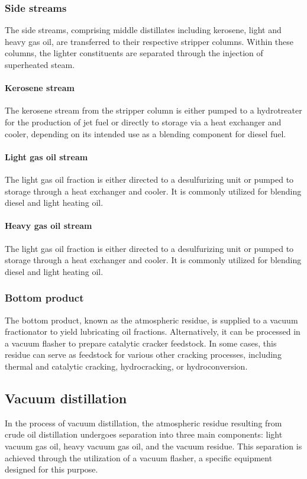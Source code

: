 \subsubsection{Side streams}
The side streams, comprising middle distillates including kerosene, light and heavy gas oil, are transferred to their respective stripper columns. 
Within these columns, the lighter constituents are separated through the injection of superheated steam.

\paragraph{Kerosene stream}
The kerosene stream from the stripper column is either pumped to a hydrotreater for the production of jet fuel or directly to storage via a heat exchanger and cooler, depending on its intended use as a blending component for diesel fuel.

\paragraph{Light gas oil stream}
The light gas oil fraction is either directed to a desulfurizing unit or pumped to storage through a heat exchanger and cooler.
It is commonly utilized for blending diesel and light heating oil.

\paragraph{Heavy gas oil stream}
The light gas oil fraction is either directed to a desulfurizing unit or pumped to storage through a heat exchanger and cooler. 
It is commonly utilized for blending diesel and light heating oil.

\subsubsection{Bottom product}
The bottom product, known as the atmospheric residue, is supplied to a vacuum fractionator to yield lubricating oil fractions.
Alternatively, it can be processed in a vacuum flasher to prepare catalytic cracker feedstock.
In some cases, this residue can serve as feedstock for various other cracking processes, including thermal and catalytic cracking, hydrocracking, or hydroconversion.

\subsection{Vacuum distillation}
In the process of vacuum distillation, the atmospheric residue resulting from crude oil distillation undergoes separation into three main components: light vacuum gas oil, heavy vacuum gas oil, and the vacuum residue.
This separation is achieved through the utilization of a vacuum flasher, a specific equipment designed for this purpose.

